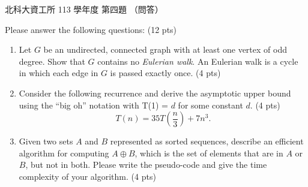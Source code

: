 \begin{pastexam}[label={px:ntut-113-ci-04}]{北科大資工所 113 學年度 第四題}
（問答）

Please answer the following questions: (12 pts)
\begin{enumerate}[label=(\arabic*)]
\item Let $G$ be an undirected, connected graph with at least one vertex of odd degree. Show that $G$ contains
no \textit{Eulerian walk}. An Eulerian walk is a cycle in which each edge in $G$ is passed exactly once.
(4 pts)
\item Consider the following recurrence and derive the asymptotic upper bound using the ``big oh'' notation
with T(1) = $d$ for some constant $d$. (4 pts)
\[ T(n) = 35T\left(\frac{n}{3}\right) + 7n^3. \]
\item Given two sets $A$ and $B$ represented as sorted sequences, describe an efficient algorithm for
computing $A\oplus B$, which is the set of elements that are in $A$ or $B$, but not in both. Please write the
pseudo-code and give the time complexity of your algorithm. (4 pts)
\end{enumerate}
\end{pastexam}

